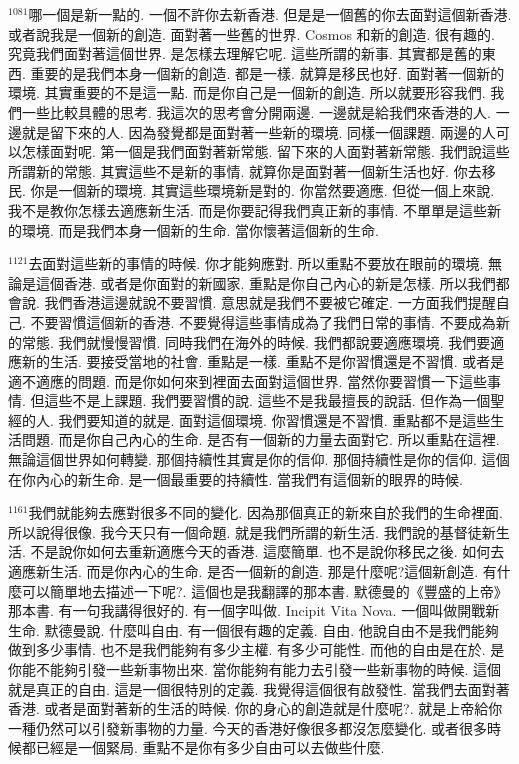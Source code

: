 \documentclass{book}
\begin{document}
$^{1081}$哪一個是新一點的.
一個不許你去新香港.
但是是一個舊的你去面對這個新香港.
或者說我是一個新的創造.
面對著一些舊的世界.
Cosmos 和新的創造.
很有趣的.
究竟我們面對著這個世界.
是怎樣去理解它呢.
這些所謂的新事.
其實都是舊的東西.
重要的是我們本身一個新的創造.
都是一樣.
就算是移民也好.
面對著一個新的環境.
其實重要的不是這一點.
而是你自己是一個新的創造.
所以就要形容我們.
我們一些比較具體的思考.
我這次的思考會分開兩邊.
一邊就是給我們來香港的人.
一邊就是留下來的人.
因為發覺都是面對著一些新的環境.
同樣一個課題.
兩邊的人可以怎樣面對呢.
第一個是我們面對著新常態.
留下來的人面對著新常態.
我們說這些所謂新的常態.
其實這些不是新的事情.
就算你是面對著一個新生活也好.
你去移民.
你是一個新的環境.
其實這些環境新是對的.
你當然要適應.
但從一個上來說.
我不是教你怎樣去適應新生活.
而是你要記得我們真正新的事情.
不單單是這些新的環境.
而是我們本身一個新的生命.
當你懷著這個新的生命.

$^{1121}$去面對這些新的事情的時候.
你才能夠應對.
所以重點不要放在眼前的環境.
無論是這個香港.
或者是你面對的新國家.
重點是你自己內心的新是怎樣.
所以我們都會說.
我們香港這邊就說不要習慣.
意思就是我們不要被它確定.
一方面我們提醒自己.
不要習慣這個新的香港.
不要覺得這些事情成為了我們日常的事情.
不要成為新的常態.
我們就慢慢習慣.
同時我們在海外的時候.
我們都說要適應環境.
我們要適應新的生活.
要接受當地的社會.
重點是一樣.
重點不是你習慣還是不習慣.
或者是適不適應的問題.
而是你如何來到裡面去面對這個世界.
當然你要習慣一下這些事情.
但這些不是上課題.
我們要習慣的說.
這些不是我最擅長的說話.
但作為一個聖經的人.
我們要知道的就是.
面對這個環境.
你習慣還是不習慣.
重點都不是這些生活問題.
而是你自己內心的生命.
是否有一個新的力量去面對它.
所以重點在這裡.
無論這個世界如何轉變.
那個持續性其實是你的信仰.
那個持續性是你的信仰.
這個在你內心的新生命.
是一個最重要的持續性.
當我們有這個新的眼界的時候.

$^{1161}$我們就能夠去應對很多不同的變化.
因為那個真正的新來自於我們的生命裡面.
所以說得很像.
我今天只有一個命題.
就是我們所謂的新生活.
我們說的基督徒新生活.
不是說你如何去重新適應今天的香港.
這麼簡單.
也不是說你移民之後.
如何去適應新生活.
而是你內心的生命.
是否一個新的創造.
那是什麼呢?這個新創造.
有什麼可以簡單地去描述一下呢?.
這個也是我翻譯的那本書.
默德曼的《豐盛的上帝》那本書.
有一句我講得很好的.
有一個字叫做.
Incipit Vita Nova.
一個叫做開戰新生命.
默德曼說.
什麼叫自由.
有一個很有趣的定義.
自由.
他說自由不是我們能夠做到多少事情.
也不是我們能夠有多少主權.
有多少可能性.
而他的自由是在於.
是你能不能夠引發一些新事物出來.
當你能夠有能力去引發一些新事物的時候.
這個就是真正的自由.
這是一個很特別的定義.
我覺得這個很有啟發性.
當我們去面對著香港.
或者是面對著新的生活的時候.
你的身心的創造就是什麼呢?.
就是上帝給你一種仍然可以引發新事物的力量.
今天的香港好像很多都沒怎麼變化.
或者很多時候都已經是一個緊局.
重點不是你有多少自由可以去做些什麼.
\end{document}
